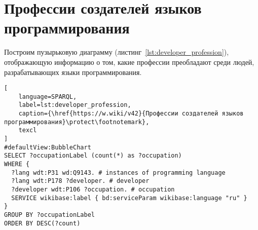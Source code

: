 \section{Профессии создателей языков программирования}

\begin{marginfigure}[-102pt]
{
\setlength{\fboxsep}{0pt}
\setlength{\fboxrule}{1pt}
}
  \caption{Профессии разработчиков языков программирования, 2017 год. Размер пузырька показывает число разработчиков с соответствуюшей профессией.}
  \label{fig:2017_profession}
\end{marginfigure}
\begin{marginfigure}[-2pt]
{
\setlength{\fboxsep}{0pt}
\setlength{\fboxrule}{1pt}
}
  \caption{Профессии разработчиков языков программирования программирования, 2020 год. Размер пузырька показывает число разработчиков с соответствуюшей профессией.}
  \label{fig:2020_profession}
\end{marginfigure}
Построим пузырьковую диаграмму (листинг~\ref{lst:developer_profession}), отображающую информацию о том, какие профессии преобладают среди людей, разрабатывающих языки программирования.
\begin{lstlisting}[
	language=SPARQL,
	label=lst:developer_profession,
	caption={\href{https://w.wiki/v42}{Профессии создателей языков программирования}\protect\footnotemark},
	texcl
]
#defaultView:BubbleChart
SELECT ?occupationLabel (count(*) as ?occupation)
WHERE {
  ?lang wdt:P31 wd:Q9143. # instances of programming language 
  ?lang wdt:P178 ?developer. # developer
  ?developer wdt:P106 ?occupation. # occupation
  SERVICE wikibase:label { bd:serviceParam wikibase:language "ru" }
}
GROUP BY ?occupationLabel 
ORDER BY DESC(?count)
\end{lstlisting}

